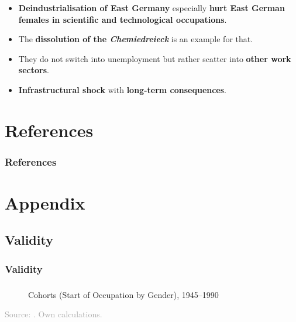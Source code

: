 \documentclass[11pt, aspectratio=1610, xcolor={dvipsnames}]{beamer}
\newcommand{\highlight}[1]{\textbf{\textcolor{PineGreen}{#1}}}
\begin{document}
	\begin{frame}
		\frametitle{}
		
		\begin{itemize}
			\item \highlight{Deindustrialisation of East Germany} especially \highlight{hurt East German females in scientific and technological occupations}.
			\item The \highlight{dissolution of the \emph{Chemiedreieck}} is an example for that.
			\item They do not switch into unemployment but rather scatter into \highlight{other work sectors}.
			\item \highlight{Infrastructural shock} with \highlight{long-term consequences}.
		\end{itemize}
		
	\end{frame}
	
	\section*{References}
	\begin{frame}[allowframebreaks]
		\frametitle{References}
		
		{\scriptsize
		
		}
		
	\end{frame}
	
	\appendix
	
	\section{Appendix}
	
	\subsection{Validity}
	\begin{frame}[plain]
		\frametitle{Validity}
	\end{frame}
	
	\begin{frame}
		\frametitle{}
		
		\begin{figure}[h]
			\centering
			\caption{Cohorts (Start of Occupation by Gender), 1945--1990}
			\label{fig:validity}
			\resizebox{75mm}{!}{}
		\end{figure}
		
		{\scriptsize
			\textcolor{darkgray}{Source: \cite{Mayer1995}. Own calculations.}
		}
		
	\end{frame}
	
\end{document}
